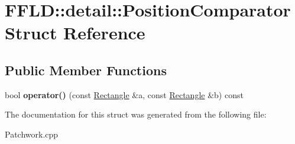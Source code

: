 \hypertarget{struct_f_f_l_d_1_1detail_1_1_position_comparator}{\section{F\-F\-L\-D\-:\-:detail\-:\-:Position\-Comparator Struct Reference}
\label{struct_f_f_l_d_1_1detail_1_1_position_comparator}
}
\subsection*{Public Member Functions}
\begin{DoxyCompactItemize}
\item 
\hypertarget{struct_f_f_l_d_1_1detail_1_1_position_comparator_a18bec662e49d613889bf64fbb88c3b87}{bool {\bfseries operator()} (const \hyperlink{class_f_f_l_d_1_1_rectangle}{Rectangle} \&a, const \hyperlink{class_f_f_l_d_1_1_rectangle}{Rectangle} \&b) const }\label{struct_f_f_l_d_1_1detail_1_1_position_comparator_a18bec662e49d613889bf64fbb88c3b87}

\end{DoxyCompactItemize}


The documentation for this struct was generated from the following file\-:\begin{DoxyCompactItemize}
\item 
Patchwork.\-cpp\end{DoxyCompactItemize}
